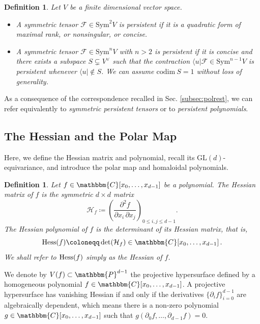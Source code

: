 \documentclass[aps,floatfix,groupedaddress,superscriptaddress,longbibliography,footinbib,notitlepage,showpacs]{revtex4-1}
\def\Hess{{\rm Hess}}
\newtheorem{definition}[theorem]{Definition}
\begin{document}
\begin{definition}\label{def:persistent-symtensor}
Let $V$ be a finite dimensional vector space.
\begin{itemize}
\item[(i)] A symmetric tensor $\mathcal{F}\in \mathrm{Sym}^2V$ is persistent if it is a quadratic form of maximal rank, or nonsingular, or concise.
\item[(ii)] A symmetric tensor $\mathcal{F}\in \mathrm{Sym}^nV$ with $n > 2$ is persistent if it is concise and there exists a subspace $S \subsetneq V^\vee$ such that the contraction $\langle u|\mathcal{F}\in \mathrm{Sym}^{n-1}V$ is persistent whenever $\langle u|\notin S$. We can assume $\mathrm{codim}~S=1$ without loss of generality.
\end{itemize}
\end{definition}

As a consequence of the correspondence recalled in Sec. \ref{subsec:polrest}, we can refer equivalently to {\it symmetric persistent tensors} or to {\it persistent polynomials}.

\subsection{The Hessian and the Polar Map}\label{subsec:hessian}
Here, we define the Hessian matrix and polynomial, recall its $\mathrm{GL}(d)$-equivariance, and introduce the polar map and homaloidal polynomials.

\begin{definition}
Let $f\in\mathbbm{C}[x_0,\ldots,x_{d-1}]$ be a polynomial.  The \emph{Hessian matrix} of $f$ is the symmetric $d\times d$ matrix
\begin{equation}
\mathcal{H}_f \coloneqq \left( \frac{\partial^2 f}{\partial x_i \, \partial x_j} \right)_{0 \leq i,j \leq d-1}.
\end{equation}
The \emph{Hessian polynomial} of $f$ is the determinant of its Hessian matrix, that is,
\begin{equation}\label{Hessian}
\Hess(f)\coloneqq\det(\mathcal{H}_f)\in\mathbbm{C}[x_0,\ldots,x_{d-1}]\,.
\end{equation}
We shall refer to $\Hess(f)$ simply as the \emph{Hessian} of $f$.
\end{definition}

We denote by $V(f)\subset\mathbbm{P}^{d-1}$ the projective hypersurface defined by a homogeneous polynomial $f\in\mathbbm{C}[x_0,\ldots,x_{d-1}]$.
A projective hypersurface has vanishing Hessian if and only if the derivatives $\{\partial_i f\}_{i=0}^{d-1}$ are algebraically dependent, which means there is a non-zero polynomial $g\in\mathbbm{C}[x_0,\ldots,x_{d-1}]$ such that $g(\partial_0 f,\ldots,\partial_{d-1}f)=0$.
\end{document}
